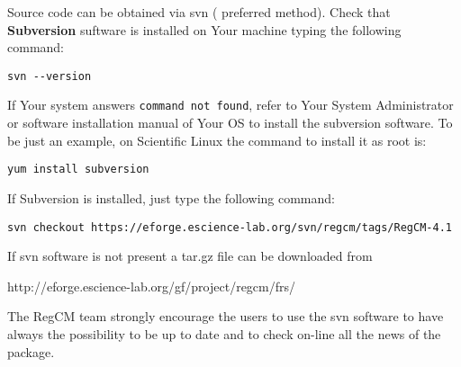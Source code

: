 %
%

Source code can be obtained via svn ( preferred method).
Check that {\bf Subversion} suftware is installed on Your machine typing
the following command:

\begin{verbatim}
svn --version
\end{verbatim}

If Your system answers \verb=command not found=, refer to Your System
Administrator or software installation manual of Your OS to install the
subversion software. To be just an example, on Scientific Linux the command
to install it as root is:

\begin{verbatim}
yum install subversion
\end{verbatim}

If Subversion is installed, just type the following command:

\begin{verbatim}
svn checkout https://eforge.escience-lab.org/svn/regcm/tags/RegCM-4.1
\end{verbatim}

If svn software is not present a tar.gz file can be downloaded from

http://eforge.escience-lab.org/gf/project/regcm/frs/

The RegCM team strongly encourage the users to use the svn software to have
always the possibility to be up to date and to check on-line all the news of
the package.

